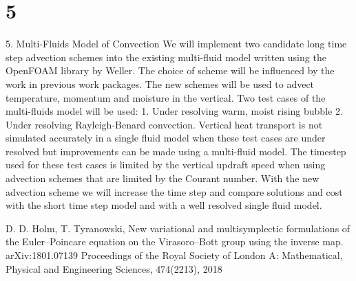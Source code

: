 \documentclass[a4paper,reqno]{elsarticle}
\numberwithin{equation}{section}
\numberwithin{figure}{section}
\begin{document}
\section{5}

5. Multi-Fluids Model of Convection
We will implement two candidate long time step advection schemes into the existing multi-fluid model written using the OpenFOAM library by Weller. The choice of scheme will be influenced by the work in previous work packages. The new schemes will be used to advect temperature, momentum and moisture in the vertical. Two test cases of the multi-fluids model will be used:
1. Under resolving warm, moist rising bubble
2. Under resolving Rayleigh-Benard convection.
Vertical heat transport is not simulated accurately in a single fluid model when these test cases are under resolved but improvements can be made using a multi-fluid model. The timestep used for these test cases is limited by the vertical updraft speed when using advection schemes that are limited by the Courant number. With the new advection scheme we will increase the time step and compare solutions and cost with the short time step model and with a well resolved single fluid model.
\begin{thebibliography}{99}
 {D. D. Holm, T. Tyranowski},
{New variational and multisymplectic formulations of the Euler--Poincare equation on the Virasoro--Bott group using the inverse map}. arXiv:1801.07139 Proceedings of the Royal Society of London A: Mathematical, Physical and Engineering Sciences, 474(2213), 2018

\end{thebibliography}
\end{document}
